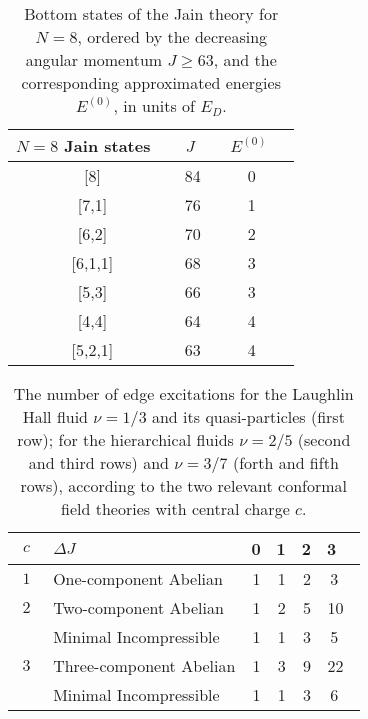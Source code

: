 
\begin{table}
\caption{Bottom states of the Jain theory for $N=8$, ordered by the 
decreasing angular momentum $J \ge 63$, and the corresponding
approximated energies $E^{(0)}$, in units of $E_D$.}
\label{tab1}
\vspace{0.2cm}
\begin{center}
\begin{tabular}{|c|c|c|} 
\hline
$N=8$ Jain states\ \ &  $J$\ \ & $E^{(0)}$\ \ \\ 
\hline
{[8]}     &   84 \   &   0 \ \\
{[7,1]}   &   76 \   &   1 \ \\
{[6,2] }  &   70 \   &   2 \ \\
\hline
{[6,1,1]} &   68  \  &   3 \ \\
{[5,3] }  &   66  \  &   3 \ \\
\hline
{[4,4] }  &   64  \  &   4 \ \\
{[5,2,1]} &   63  \  &   4 \ \\
\hline
\end{tabular}
\end{center}
\end{table}

\begin{table}
\caption{The number of edge excitations for the Laughlin Hall fluid 
$\nu=1/3$ and its quasi-particles (first row); for the hierarchical fluids 
$\nu=2/5$ (second and third rows) and $\nu=3/7$ (forth and fifth rows), 
according to the two relevant conformal field theories with
central charge $c$.}
\label{tab2}
\vspace{0.2cm}
\begin{center}
\begin{tabular}{| c | l | r r r r|}
\hline
$\ \ c\ \ $ & $\Delta J$      & 0 & 1 & 2 & 3 \ \\ 
\hline 
$1$ & One-component Abelian   & 1 & 1 & 2 & 3 \ \\
\hline
$2$ & Two-component Abelian   & 1 & 2 & 5 & 10\ \\
    & Minimal Incompressible  & 1 & 1 & 3 & 5 \ \\
\hline
$3$ & Three-component Abelian & 1 & 3 & 9 & 22\ \\
    & Minimal Incompressible  & 1 & 1 & 3 & 6 \ \\
\hline
\end{tabular}
\end{center}
\end{table}

